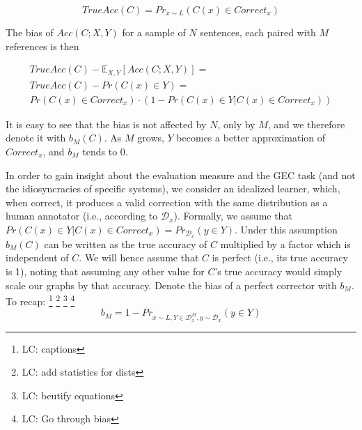 \documentclass[letter,11pt]{article}
\newcommand{\lc}[1]{\footnote{\color{green}LC: #1}}
\begin{document}
                \begin{equation*}
		  TrueAcc(C) = Pr_{x\sim{L}}\left(C\left(x\right)\in Correct_x\right)
		\end{equation*}
                

                The bias of $Acc(C;X,Y)$ for a sample of $N$ sentences, each paired with $M$ references
                is then

                \begin{footnotesize}
                  \centering
                \begin{align*}
                  TrueAcc(C) - \mathbb{E}_{X,Y}\left[Acc(C;X,Y)\right] = \\
                  TrueAcc(C) - Pr(C(x) \in Y) = \\
                  Pr(C(x) \in Correct_x) \cdot \left(1 - Pr(C(x) \in Y \vert C(x) \in Correct_x) \right)     
                \end{align*}
                \end{footnotesize}

                
		It is easy to see that the bias is not affected by $N$, only by $M$, and we therefore denote it
                with $b_M(C)$. As $M$ grows, $Y$ becomes a better approximation of $Correct_x$, and $b_M$ tends to 0.
		
		In order to gain insight about the evaluation measure and the GEC task
		(and not the idiosyncracies of specific systems), we consider an idealized learner,
		which, when correct, it produces a valid correction with
		the same distribution as a human annotator (i.e., according to $\mathcal{D}_x$).
		Formally, we assume that $Pr(C(x) \in Y \vert C(x) \in Correct_x) = Pr_{\mathcal{D}_x}(y \in Y)$.
		Under this assumption $b_M(C)$ can be written as the true accuracy of $C$ multiplied
		by a factor which is independent of $C$. We will hence assume that $C$ is perfect (i.e., its true
		accuracy is 1), noting that assuming any other value for $C$'s true accuracy would simply scale
		our graphs by that accuracy. Denote the bias of a perfect corrector with $b_M$. To recap:
		\lc{captions}
		\lc{add statistics for dists}
		\lc{beutify equations}
		\lc{Go through bias}
		\begin{equation*}
		b_M = 1 - Pr_{x \sim L, Y \in \mathcal{D}_x^M, y \sim \mathcal{D}_x}(y \in Y)
		\end{equation*}
    
\end{document}
